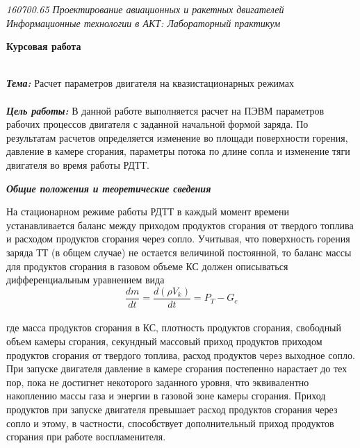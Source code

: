 \documentclass{article}
\begin{document}
\begin{flushright}
\begin{scriptsize}
\textit{160700.65   Проектирование авиационных и ракетных двигателей\\
 Информационные технологии в АКТ: Лабораторный практикум} \\
 \end{scriptsize}
\end{flushright}
\begin{center}
\textbf{Курсовая работа}\\
\end{center}
~\\
\textbf{\textit{Тема:}}
Расчет параметров двигателя на квазистационарных режимах\\
~\\
\textbf{\textit{Цель работы:}}
В данной работе выполняется расчет на ПЭВМ параметров рабочих процессов двигателя с заданной начальной формой заряда. По результатам расчетов определяется изменение во площади поверхности горения, давление в камере сгорания, параметры потока по длине сопла и изменение тяги двигателя во время работы РДТТ.
\begin{center}
\textbf{\textit{Общие положения и теоретические сведения}}

\end{center}
На стационарном режиме работы РДТТ в каждый момент времени устанавливается баланс между приходом продуктов сгорания от твердого топлива и расходом продуктов сгорания через сопло. Учитывая, что поверхность горения заряда ТТ (в общем случае) не остается величиной постоянной, то баланс массы для продуктов сгорания в газовом объеме КС должен описываться дифференциальным уравнением вида
\begin{equation}\label{eq:fourierrow} 
\frac{dm}{dt}= \frac{d(\rho V_k)}{dt} = P_T - G_c
\end{equation}\\
где масса продуктов сгорания в КС, плотность продуктов сгорания, свободный объем камеры сгорания, секундный массовый приход продуктов приходом продуктов сгорания от твердого топлива, расход продуктов через выходное сопло.\\
При запуске двигателя давление в камере сгорания постепенно нарастает до тех пор, пока не достигнет некоторого заданного уровня, что эквивалентно накоплению массы газа и энергии в газовой зоне камеры сгорания. Приход продуктов при запуске двигателя превышает расход продуктов сгорания через сопло и этому, в частности, способствует дополнительный приход продуктов сгорания при работе воспламенителя.\\
\end{document}
